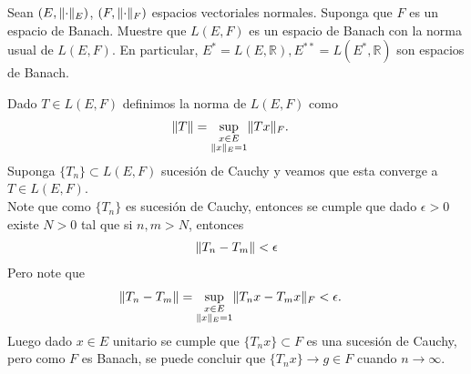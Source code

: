 \begin{homeworkProblem}
  Sean $(E,\lVert\cdot\rVert_{E})$, $(F,\lVert\cdot\rVert_{F})$ espacios vectoriales normales. Suponga que $F$ es un espacio de Banach. Muestre que $L(E,F)$ es un espacio de Banach con la norma usual de $L(E,F)$. En particular, $E^{*}=L(E,\mathbb{R}),E^{**}=L(E^{*},\mathbb{R})$ son espacios de Banach. 
  \begin{solution}
    Dado $T\in L(E,F)$ definimos la norma de $L(E,F)$ como
    \begin{align*}
      \lVert T\rVert&=\sup_{\substack{x\in E\\\lVert x\rVert_{E}=1}}\lVert Tx\rVert_{F}.
    \end{align*}
    Suponga $\{T_n\}\subset L(E,F)$ sucesión de Cauchy y veamos que esta converge a $T\in L(E,F)$.\\
    Note que como $\{T_n\}$ es sucesión de Cauchy, entonces se cumple que dado $\epsilon>0$ existe $N>0$ tal que si $n,m>N$, entonces
    \begin{align*}
      \lVert T_n-T_m\rVert<\epsilon
    \end{align*}
    Pero note que
    \begin{align*}
      \lVert T_n-T_m\rVert&=\sup_{\substack{x\in E\\ \lVert x\rVert_{E}=1}}\lVert T_{n}x-T_{m}x\rVert_{F}<\epsilon.
    \end{align*}
    Luego dado $x\in E$ unitario se cumple que $\{T_nx\}\subset F$ es una sucesión de Cauchy, pero como $F$ es Banach, se puede concluir que $\{T_nx\}\to g\in F$ cuando $n\to\infty$. 
  \end{solution}
\end{homeworkProblem}
